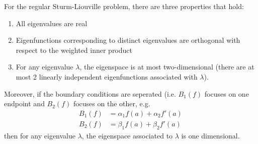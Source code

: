 \begin{thm}\label{thm:28April2008:thm3.9}
For the regular Sturm-Liouville problem, there are three
properties that hold:
\begin{enumerate}
\item All eigenvalues are real
\item Eigenfunctions corresponding to distinct eigenvalues
  are orthogonal with respect to the weighted inner product
\item For any eigenvalue $\lambda$, the eigenspace is at
  most two-dimensional (there are at most 2 linearly
  independent eigenfunctions associated with $\lambda$).
\end{enumerate}
Moreover, if the boundary conditions are seperated
(i.e. $B_{1}(f)$ focuses on one endpoint and $B_{2}(f)$
focuses on the other, e.g.
\begin{align*}
B_{1}(f) &= \alpha_{1}f(a) + \alpha_{2}f'(a)\\
B_{2}(f) &= \beta_{1}f(a) + \beta_{2}f'(a)
\end{align*}
then for any eigenvalue $\lambda$, the eigenspace associated
to $\lambda$ is one dimensional.
\end{thm}
